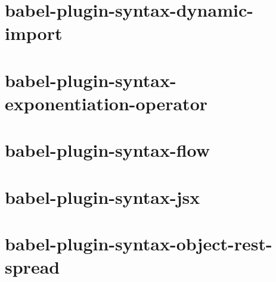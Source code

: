 \documentclass[twoside]{book}
\newcommand{\+}{\discretionary{\mbox{\scriptsize$\hookleftarrow$}}{}{}}
\begin{document}
\chapter{babel-\/plugin-\/syntax-\/dynamic-\/import}
\label{md__c_1_workspace_demo_src_main_script_node_modules_babel-plugin-syntax-dynamic-import__r_e_a_d_m_e}

\chapter{babel-\/plugin-\/syntax-\/exponentiation-\/operator}
\label{md__c_1_workspace_demo_src_main_script_node_modules_babel-plugin-syntax-exponentiation-operator__r_e_a_d_m_e}

\chapter{babel-\/plugin-\/syntax-\/flow}
\label{md__c_1_workspace_demo_src_main_script_node_modules_babel-plugin-syntax-flow__r_e_a_d_m_e}

\chapter{babel-\/plugin-\/syntax-\/jsx}
\label{md__c_1_workspace_demo_src_main_script_node_modules_babel-plugin-syntax-jsx__r_e_a_d_m_e}

\chapter{babel-\/plugin-\/syntax-\/object-\/rest-\/spread}
\label{md__c_1_workspace_demo_src_main_script_node_modules_babel-plugin-syntax-object-rest-spread__r_e_a_d_m_e}

\end{document}
